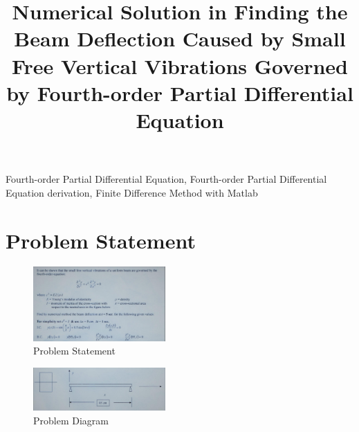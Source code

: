 \documentclass[conference]{IEEEtran}
\begin{document}
	
	\title{Numerical Solution in Finding the Beam Deflection Caused by Small Free Vertical Vibrations Governed by Fourth-order Partial Differential Equation\\}
	
	\author{
	}
	
	\maketitle
	
	\begin{IEEEkeywords}
		Fourth-order Partial Differential Equation, Fourth-order Partial Differential Equation derivation, Finite Difference Method with Matlab
	\end{IEEEkeywords}
	
	\section{Problem Statement}
	
	\begin{figure}[h]
		\centering
		\includegraphics[width=0.45\textwidth]{1.png}
		\caption{Problem Statement}
	\end{figure}
	\begin{figure}[h]
		\centering
		\includegraphics[width=0.45\textwidth]{2.png}
		\caption{Problem Diagram}
	\end{figure}
	
\end{document}
